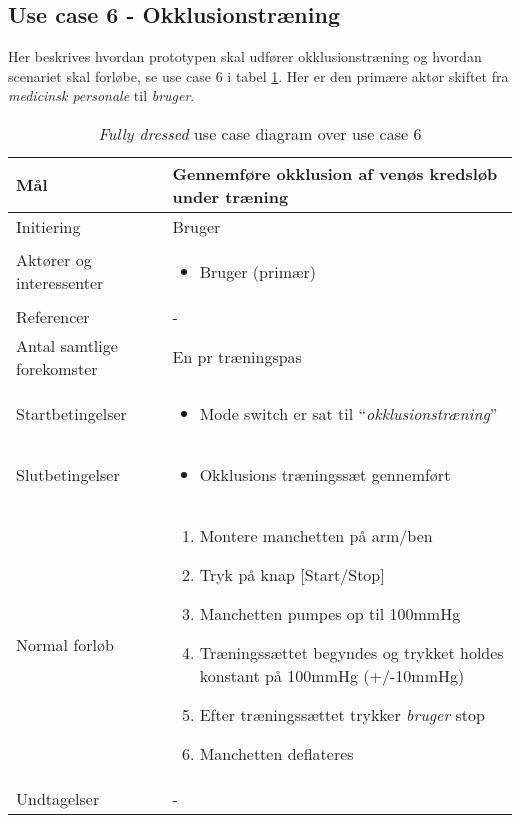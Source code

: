 	\subsection{Use case 6 - Okklusionstræning}
	Her beskrives hvordan prototypen skal udfører okklusionstræning og hvordan scenariet skal forløbe, se use case 6 i tabel \ref{tab:uc6}. Her er den primære aktør skiftet fra \textit{medicinsk personale} til \textit{bruger}.
	\begin{table}[H]
		\begin{center}
			\begin{tabular}{ | p{} | p{}| } 
				\hline
				Mål & Gennemføre okklusion af venøs kredsløb under træning  \\ 
				\hline
				Initiering &  Bruger\\
				\hline
				Aktører og interessenter & 
				\begin{itemize}
					\item Bruger (primær)
				\end{itemize} \\ 
				\hline
				Referencer & - \\ 
				\hline
				Antal samtlige forekomster & En pr træningspas \\ 
				\hline	
				Startbetingelser & 
				\begin{itemize}
					\item Mode switch er sat til  “\textit{okklusionstræning}”
 				\end{itemize} \\ 
				\hline
				Slutbetingelser & 
				\begin{itemize}
					\item Okklusions træningssæt gennemført
				\end{itemize} \\ 
				\hline
				Normal forløb & \begin{enumerate}
					\setlength\itemsep{0cm} %
					\item Montere manchetten på arm/ben
					\item Tryk på knap [Start/Stop]
					\item Manchetten pumpes op til 100mmHg
					\item Træningssættet begyndes og trykket holdes konstant på 100mmHg (+/-10mmHg)
					\item Efter træningssættet trykker \textit{bruger} stop
					\item Manchetten deflateres
				\end{enumerate} \\ 
				\hline
				Undtagelser & - \\ 
				\hline
			\end{tabular}
		\end{center}
		
			\caption{\textit{Fully dressed} use case diagram over use case 6} \label{tab:uc6}
		\end{table}
	\newpage
		